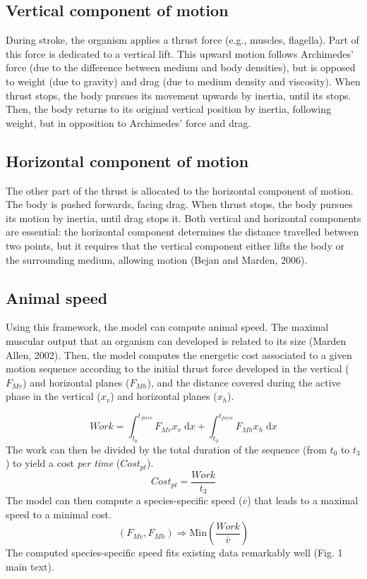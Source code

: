 \documentclass[utf8, 12 pt]{frontiers_suppmat}
\begin{document}
\subsection{Vertical component of motion}
During stroke, the organism applies a thrust force (e.g., muscles, flagella). Part of this force is dedicated to a vertical lift. This upward motion follows Archimedes’ force (due to the difference between medium and body densities), but is opposed to weight (due to gravity) and drag (due to medium density and viscosity). When thrust stops, the body pursues its movement upwards by inertia, until its stops. Then, the body returns to its original vertical position by inertia, following weight, but in opposition to Archimedes' force and drag.

\subsection{Horizontal component of motion}
The other part of the thrust is allocated to the horizontal component of motion. The body is pushed forwards, facing drag. When thrust stops, the body pursues its motion by inertia, until drag stops it. Both vertical and horizontal components are essential: the horizontal component determines the distance travelled between two points, but it requires that the vertical component either lifts the body or the surrounding medium, allowing motion (Bejan and Marden, 2006).

\subsection{Animal speed}
Using this framework, the model can compute animal speed. The maximal muscular output that an organism can developed is related to its size (Marden  Allen, 2002). Then, the model computes the energetic cost associated to a given motion sequence according to the initial thrust force developed in the vertical ($F_{Mv}$) and horizontal planes ($F_{Mh}$), and the distance covered during the active phase in the vertical ($x_v$) and horizontal planes ($x_h$). 

\begin{equation}
	Work= \int _{t_0} ^{t_{force}} F_{Mv} x_v \; \mathrm{d}x + \int _{t_0} ^{t_{force}} F_{Mh} x_h \; \mathrm{d}x
\end{equation}
The work can then be divided by the total duration of the sequence (from $t_0$ to $t_3$) to yield a cost \textit{per time} ($Cost_{pt}$).
\begin{equation}
	Cost_{pt}=\frac{Work}{t_3} 
\end{equation}
The model can then compute a species-specific speed ($\overline{v}$) that leads to a maximal speed to a minimal cost.
\begin{equation}
	(F_{Mv},F_{Mh}) \Rightarrow \text{Min} \left( \frac{Work}{\overline{v}} \right)	
\end{equation}
The computed species-specific speed fits existing data remarkably well (Fig. 1 main text).
\end{document}
